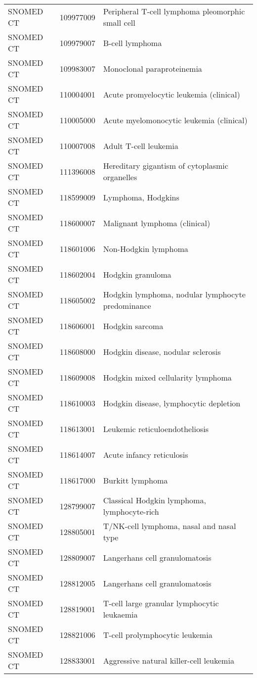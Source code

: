 \begin{table}[ht]
\begin{tabular}{lll}
  SNOMED CT & 109977009 & Peripheral T-cell lymphoma pleomorphic small cell \\ 
  SNOMED CT & 109979007 & B-cell lymphoma \\ 
  SNOMED CT & 109983007 & Monoclonal paraproteinemia \\ 
  SNOMED CT & 110004001 & Acute promyelocytic leukemia (clinical) \\ 
  SNOMED CT & 110005000 & Acute myelomonocytic leukemia (clinical) \\ 
  SNOMED CT & 110007008 & Adult T-cell leukemia \\ 
  SNOMED CT & 111396008 & Hereditary gigantism of cytoplasmic organelles \\ 
  SNOMED CT & 118599009 & Lymphoma, Hodgkins \\ 
  SNOMED CT & 118600007 & Malignant lymphoma (clinical) \\ 
  SNOMED CT & 118601006 & Non-Hodgkin lymphoma \\ 
  SNOMED CT & 118602004 & Hodgkin granuloma \\ 
  SNOMED CT & 118605002 & Hodgkin lymphoma, nodular lymphocyte predominance \\ 
  SNOMED CT & 118606001 & Hodgkin sarcoma \\ 
  SNOMED CT & 118608000 & Hodgkin disease, nodular sclerosis \\ 
  SNOMED CT & 118609008 & Hodgkin mixed cellularity lymphoma \\ 
  SNOMED CT & 118610003 & Hodgkin disease, lymphocytic depletion \\ 
  SNOMED CT & 118613001 & Leukemic reticuloendotheliosis \\ 
  SNOMED CT & 118614007 & Acute infancy reticulosis \\ 
  SNOMED CT & 118617000 & Burkitt lymphoma \\ 
  SNOMED CT & 128799007 & Classical Hodgkin lymphoma, lymphocyte-rich \\ 
  SNOMED CT & 128805001 & T/NK-cell lymphoma, nasal and nasal type \\ 
  SNOMED CT & 128809007 & Langerhans cell granulomatosis \\ 
  SNOMED CT & 128812005 & Langerhans cell granulomatosis \\ 
  SNOMED CT & 128819001 & T-cell large granular lymphocytic leukaemia \\ 
  SNOMED CT & 128821006 & T-cell prolymphocytic leukemia \\ 
  SNOMED CT & 128833001 & Aggressive natural killer-cell leukemia \\ 

\end{tabular}
\end{table}
